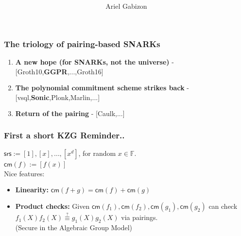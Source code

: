 \documentclass[shadesubsections,compress,14pt,mathserif]{beamer}
\title{ \bf \papertitle \\[0.72cm]}
\author{Ariel Gabizon}
\newcommand{\F}{\ensuremath{{\mathbb F}}}
\newcommand{\enc}[1]{\ensuremath{\left[#1\right ]}}
\newcommand{\cm}{\ensuremath{\mathsf{cm}}}
\newcommand{\defeq}{\ensuremath{:=}}
\newcommand{\srs}{\ensuremath{\mathsf{srs}}}
\begin{document}
\boldmath
\begin{frame}
  \titlepage
\end{frame}


\begin{frame}
\frametitle{The triology of pairing-based SNARKs}\pause

\begin{enumerate}
 \item \textbf{A new hope (for SNARKs, not the universe)} - [Groth10,\textbf{GGPR},...,Groth16]\pause 
 \vspace{0.2in}
 \item  \textbf{The polynomial commitment scheme strikes back} - [vsql,\textbf{Sonic},Plonk,Marlin,...]\pause 
 \vspace{0.2in}
 
 \item  \textbf{Return of the pairing} - [Caulk,...]
 
\end{enumerate}

\end{frame}
\begin{frame}
 \frametitle{First a short KZG Reminder..}   %
 $\srs \defeq \enc{1},\enc{x},\ldots,\enc{x^d}$, for random $x\in \F$.\\ 
 $\cm(f)\defeq   \enc{f(x)}$\\ 
 \vspace{0.2in}
 Nice features:\pause
 \begin{itemize}
  \item \textbf{Linearity:} $\cm(f+g) = \cm(f)+\cm(g)$\pause
  \item \textbf{Product checks:} Given $\cm(f_1),\cm(f_2),\cm(g_1),\cm(g_2)$ can check $f_1(X)f_2(X)\stackrel{?}{\equiv} g_1(X)g_2(X)$ via pairings.\\
  (Secure in the Algebraic Group Model)
 \end{itemize}

\end{frame}
\end{document}
